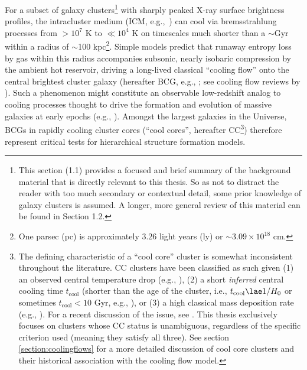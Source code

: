 For  a subset  of galaxy  clusters\footnote{This section (1.1) provides a focused and brief summary of
 the background 
material that is directly relevant to this thesis. So as not to 
distract the reader with too much secondary or contextual detail, 
some prior knowledge of galaxy clusters is assumed. 
A longer, more general review of this material can be found 
in Section 1.2.} with  sharply peaked  X-ray surface
brightness     profiles,     the     intracluster     medium     (ICM,
e.g.,~\citealt{sarazin86}) can cool  via bremsstrahlung processes from
$>10^7$ K to $\ll 10^4$ K on timescales much shorter than a $\sim$Gyr within
a radius of $\sim$100 kpc\footnote{One parsec (pc) is approximately $3.26$ light years (ly)
or $\sim3.09\times10^{18}$ cm.}.  Simple models predict that runaway entropy
loss by  gas within this radius accompanies  subsonic, nearly isobaric
compression  by  the  ambient  hot  reservoir,  driving  a  long-lived
classical ``cooling  flow'' onto the central  brightest cluster galaxy
(hereafter  BCG, e.g.,  \citealt{lea73,cowie77,fabian77};  see cooling
flow  reviews by  \citealt{fabian94,peterson06}).   Such a  phenomenon
might  constitute   an  observable  low-redshift   analog  to  cooling
processes  thought to  drive the  formation and  evolution  of massive
galaxies at early epochs (e.g., \citealt{silk77,rees77}).  Amongst the
largest  galaxies in  the Universe,  BCGs in  rapidly  cooling cluster
cores  (``cool  cores'', hereafter  CC\footnote{ The
defining characteristic of a ``cool core'' cluster is somewhat inconsistent
throughout the literature.  CC clusters have been classified as such given (1)
an observed central temperature drop (e.g., \citealt{sanderson06,burns08}), (2)
a short {\it inferred} central cooling time $t_\mathrm{cool}$ (shorter than the
age of the cluster, i.e., $t_\mathrm{cool}\lae1/H_0$ or sometimes
$t_\mathrm{cool} < 10$ Gyr, e.g.,  \citealt{bauer05,donahue07}), or (3) a high
classical mass deposition rate (e.g., \citealt{chen07}). For a recent
discussion of the issue, see \citet{hudson10}.  This thesis exclusively focuses
on clusters whose CC status is unambiguous, regardless of the specific
criterion used (meaning they satisfy all three). See section
\ref{section:coolingflows} for a more detailed discussion of cool core clusters
and their historical association with the cooling flow model.})  therefore represent  critical
tests for hierarchical structure formation models.






